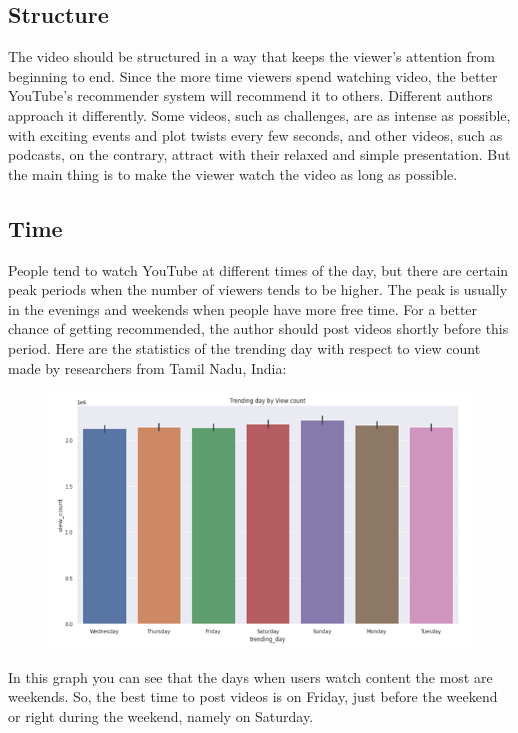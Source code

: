 \documentclass[12pt]{article}
\begin{document}
\subsection{Structure}

The video should be structured in a way that keeps the viewer's attention from beginning to end. Since the more time viewers spend watching video, the better YouTube's recommender system will recommend it to others. Different authors approach it differently. Some videos, such as challenges, are as intense as possible, with exciting events and plot twists every few seconds, and other videos, such as podcasts, on the contrary, attract with their relaxed and simple presentation. But the main thing is to make the viewer watch the video as long as possible.

\subsection{Time}

People tend to watch YouTube at different times of the day, but there are certain peak periods when the number of viewers tends to be higher. The peak is usually in the evenings and weekends when people have more free time. For a better chance of getting recommended, the author should post videos shortly before this period. Here are the statistics of the trending day with respect to view count made by researchers from Tamil Nadu, India:

\begin{figure}[H]  %
    \centering     %
    \includegraphics[width=1\textwidth]{image3.png}
\end{figure}
\cite{4.1}
In this graph you can see that the days when users watch content the most are weekends. So, the best time to post videos is on Friday, just before the weekend or right during the weekend, namely on Saturday.
\end{document}
